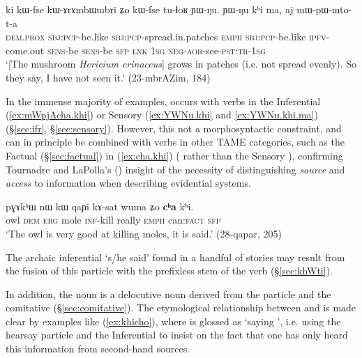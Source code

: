 \begin{exe}
\ex \label{ex:YWNu.khi.ma}
\gll ki kɯ-fse kɯ-ɤrɤmbɯmbri ʑo kɯ-fse tu-ɬoʁ ɲɯ-ŋu. ɲɯ-ŋu kʰi ma, aj mɯ-pɯ-mto-t-a \\
\textsc{dem}.\textsc{prox} \textsc{sbj}:\textsc{pcp}-be.like \textsc{sbj}:\textsc{pcp}-spread.in.patches \textsc{emph} \textsc{sbj}:\textsc{pcp}-be.like \textsc{ipfv}-come.out \textsc{sens}-be \textsc{sens}-be \textsc{sfp} \textsc{lnk} \textsc{1sg} \textsc{neg}-\textsc{aor}-see-\textsc{pst}:\textsc{tr}-\textsc{1sg} \\
\glt `[The mushroom \textit{Hericium erinaceus}] grows in patches (i.e. not spread evenly). So they say, I have not seen it.' (23-mbrAZim, 184)
\end{exe}

In the immense majority of examples,  occurs with verbs in the Inferential (\ref{ex:mWpjAcha.khi}) or Sensory (\ref{ex:YWNu.khi} and \ref{ex:YWNu.khi.ma}) (§\ref{sec:ifr}, §\ref{sec:sensory}). However, this not a morphosyntactic constraint, and  can in principle be combined with verbs in other TAME categories, such as the Factual (§\ref{sec:factual}) in (\ref{ex:cha.khi}) ( rather than the Sensory ), confirming Tournadre and LaPolla's (\citeyear{tournadre14evidentiality}) insight of the necessity of distinguishing \textit{source} and \textit{access} to information when describing evidential systems.

\begin{exe}
\ex \label{ex:cha.khi}
\gll pɣɤkʰɯ nɯ kɯ qaɲi kɤ-sat wuma ʑo \textbf{cʰa} kʰi. \\
owl \textsc{dem} \textsc{erg} mole \textsc{inf}-kill really \textsc{emph} can:\textsc{fact} \textsc{sfp} \\
\glt `The owl is very good at killing moles, it is said.' (28-qapar, 205)
\end{exe}

The archaic inferential  `s/he said' found in a handful of stories may result from the fusion of this particle with the prefixless stem of the verb  (§\ref{sec:khWti}).

In addition, the noun  is a delocutive noun derived from the particle  and the comitative  (§\ref{sec:comitative}). The etymological relationship between  and  is made clear by examples like (\ref{ex:khicho}), where  is glossed as `saying ', i.e. using the hearsay particle and the Inferential to insist on the fact that one has only heard this information from second-hand sources.

